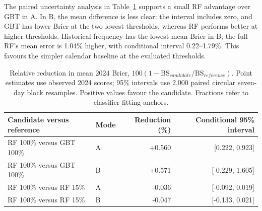 The paired uncertainty analysis in Table~\ref{tab:pairedmodels} supports a small RF advantage over GBT in A. In B, the mean difference is less clear: the interval includes zero, and GBT has lower Brier at the two lowest thresholds, whereas RF performs better at higher thresholds. Historical frequency has the lowest mean Brier in B; the full RF's mean error is 1.04\% higher, with conditional interval 0.22--1.79\%. This favours the simpler calendar baseline at the evaluated thresholds.

\begin{table}[htbp]\centering\small
\begin{tabular}{llrr}\toprule
Candidate versus reference & Mode & Reduction (\%) & Conditional 95\% interval\\\midrule
RF 100\% versus GBT 100\% & A & +0.560 & [0.222, 0.923] \\
RF 100\% versus GBT 100\% & B & +0.571 & [-0.229, 1.605] \\
RF 100\% versus RF 15\% & A & -0.036 & [-0.092, 0.019] \\
RF 100\% versus RF 15\% & B & -0.047 & [-0.133, 0.021] \\
\bottomrule\end{tabular}
\caption{Relative reduction in mean 2024 Brier, $100(1-\mathrm{BS}_{candidate}/\mathrm{BS}_{reference})$. Point estimates use observed 2024 scores; 95\% intervals use 2,000 paired circular seven-day block resamples. Positive values favour the candidate. Fractions refer to classifier fitting anchors.}\label{tab:pairedmodels}
\end{table}

\FloatBarrier
